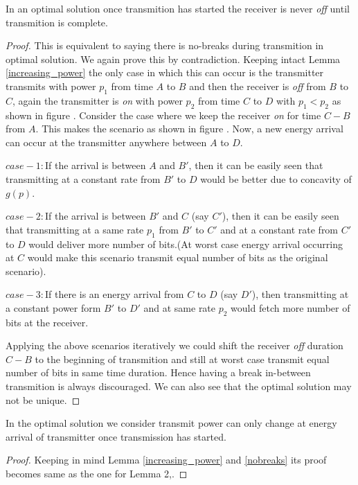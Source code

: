\begin{lemma}
In an optimal solution once transmition has started the receiver is never \textit{off} until transmition is complete. \label{nobreaks}
\end{lemma}
\begin{proof}
This is equivalent to saying there is no-breaks during transmition in optimal solution. We again prove this by contradiction. Keeping intact Lemma \ref{increasing_power} the only case in which this can occur is the transmitter transmits with power $p_1$ from time $A$ to $B$ and then the receiver is \textit{off} from $B$ to $C$, again the transmitter is \textit{on} with power $p_2$ from time $C$ to $D$ with $p_1<p_2$ as shown in figure . Consider the case where we keep the receiver \textit{on} for time $C-B$ from $A$. This makes the scenario as shown in figure . Now, a new energy arrival can occur at the transmitter anywhere between $A$ to $D$. 

$case-1:$If the arrival is between $A$ and $B'$, then it can be easily seen that transmitting at a constant rate from $B'$ to $D$ would be better due to concavity of $g(p)$.

$case-2:$If the arrival is between $B'$ and $C$ (say $C'$), then it can be easily seen that transmitting at a same rate $p_1$ from $B'$ to $C'$ and  at a constant rate from $C'$ to $D$ would deliver more number of bits.(At worst case energy arrival occurring at $C$ would make this scenario transmit equal number of bits as the original scenario).

$case-3:$If there is an energy arrival from $C$ to $D$ (say $D'$), then transmitting at a constant power form $B'$ to $D'$ and at same rate $p_2$ would fetch more number of bits at the receiver.

Applying the above scenarios iteratively we could shift the receiver \textit{off} duration $C-B$ to the beginning of transmition and still at worst case transmit equal number of bits in same time duration. Hence having a break in-between transmition is always discouraged. We can also see that the optimal solution may not be unique.
\end{proof}

\begin{lemma}
In the optimal solution we consider transmit power can only change at energy arrival of transmitter once transmission has started. 
\end{lemma}
\begin{proof}
Keeping in mind Lemma \ref{increasing_power} and \ref{nobreaks} its proof becomes same as the one for Lemma 2,\cite{Yang}. 
\end{proof}	
